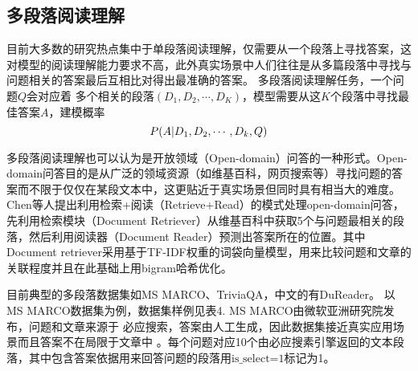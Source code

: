


\subsection{多段落阅读理解}
目前大多数的研究热点集中于单段落阅读理解，仅需要从一个段落上寻找答案，这对模型的阅读理解能力要求不高，此外真实场景中人们往往是从多篇段落中寻找与问题相关的答案最后互相比对得出最准确的答案。
多段落阅读理解任务，一个问题$Q$会对应着
多个相关的段落$(D_1,D_2,\cdots,D_K)$，模型需要从这$K$个段落中寻找最佳答案$A$，建模概率
\begin{equation}
	P(A|D_1,D_2,\cdots,D_k,Q) \notag
\end{equation}

多段落阅读理解也可以认为是开放领域（Open-domain）问答的一种形式。Open-domain问答目的是从广泛的领域资源（如维基百科，网页搜索等）寻找问题的答案而不限于仅仅在某段文本中，这更贴近于真实场景但同时具有相当大的难度。Chen等人提出利用检索+阅读（Retrieve+Read）的模式处理open-domain问答，先利用检索模块（Document Retriever）从维基百科中获取5个与问题最相关的段落，然后利用阅读器（Document Reader）预测出答案所在的位置。其中Document retriever采用基于TF-IDF权重的词袋向量模型，用来比较问题和文章的关联程度并且在此基础上用bigram哈希优化。


目前典型的多段落数据集如MS MARCO、TriviaQA，中文的有DuReader。
以MS MARCO数据集为例，数据集样例见表4. MS MARCO由微软亚洲研究院发布，问题和文章来源于
必应搜索，答案由人工生成，因此数据集接近真实应用场景而且答案不在局限于文章中
。每个问题对应10个由必应搜素引擎返回的文本段落，其中包含答案依据用来回答问题的段落用$\text{is\_select=1}$标记为1。

